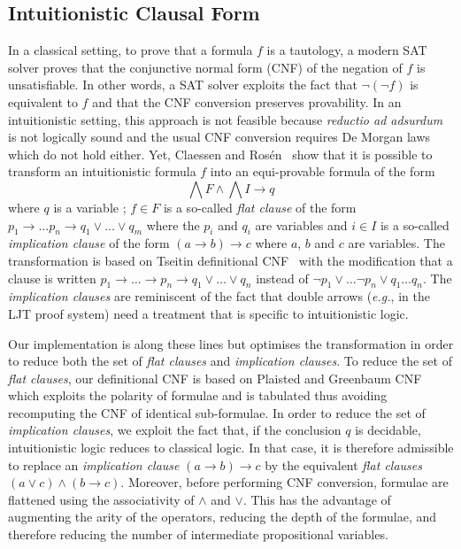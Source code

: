 \documentclass[utf8,a4paper,UKenglish,cleveref, autoref, thm-restate]{lipics-v2019}
\begin{document}
\subsection{Intuitionistic Clausal Form}


In a classical setting, to prove that a formula $f$ is a tautology, a modern
SAT solver proves that the conjunctive normal form (CNF) of the
negation of $f$ is unsatisfiable. In other words, a SAT solver
exploits the fact that $\neg (\neg f)$ is equivalent to $f$ and that
the CNF conversion preserves provability.
%
In an intuitionistic setting, this approach is not feasible because
\emph{reductio ad adsurdum} is not logically sound and
the usual CNF conversion requires De Morgan laws which do not hold either.
%
Yet, Claessen and Rosén~\cite{ClaessenR15} show that it is possible to
transform an intuitionistic  formula $f$ into an equi-provable formula of the form
\[
  \bigwedge F \land \bigwedge I \to q
\]
where $q$ is a variable ; $f \in F$ is a so-called \emph{flat clause} of the
form $p_1 \to \dots p_n \to q_1 \lor \dots \lor q_m$ where the $p_i$
and $q_i$ are variables and $i\in I$ is a so-called \emph{implication clause}
of the form $(a\to b) \to c $ where $a$, $b$ and $c$ are variables.
%
The transformation is based on Tseitin definitional CNF~\cite{Tseitin1983} with the
modification that a clause is written
$p_1 \to \dots \to p_n \to q_1 \lor \dots \lor q_n$ instead of
$\neg p_1 \lor \dots \neg p_n \lor q_1 \dots q_n$.
%
The \emph{implication clauses} are reminiscent of the fact that double
arrows (\emph{e.g.}, in the LJT proof system) need a
treatment that is specific to intuitionistic logic. %

Our implementation is along these lines but optimises the
transformation in order to reduce both the set of \emph{flat clauses}
and \emph{implication clauses}.  To reduce the set of \emph{flat
  clauses}, our definitional CNF is based on Plaisted and Greenbaum
CNF~\cite{PlaistedG86} which exploits the polarity of formulae and is
tabulated thus avoiding recomputing the CNF of identical sub-formulae.
%
In order to reduce the set of \emph{implication clauses}, we exploit
the fact that, if the conclusion $q$ is decidable, intuitionistic logic reduces to
classical logic. In that case, it is therefore
admissible to replace an \emph{implication clause} $(a \to b) \to c$
by the equivalent \emph{flat clauses} $(a\lor c) \land (b \to c)$.
%
Moreover, before performing CNF conversion, formulae are flattened
using the associativity of $\land$ and $\lor$. This has the advantage
of augmenting the arity of the operators, reducing the depth of the
formulae, and therefore reducing the number of intermediate propositional variables.
\end{document}
